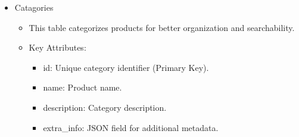 \documentclass{llncs}
\begin{document}
\begin{enumerate}
\begin{itemize}
              \item Catagories
                    \begin{itemize}
                        \item This table categorizes products for better organization and searchability.
                        \item Key Attributes:
                              \begin{itemize}
                                  \item id: Unique category identifier (Primary Key).
                                  \item name: Product name.
                                  \item description: Category description.
                                  \item extra\_info: JSON field for additional metadata.
                              \end{itemize}
                    \end{itemize}
          \end{itemize}


\end{enumerate}
\end{document}
